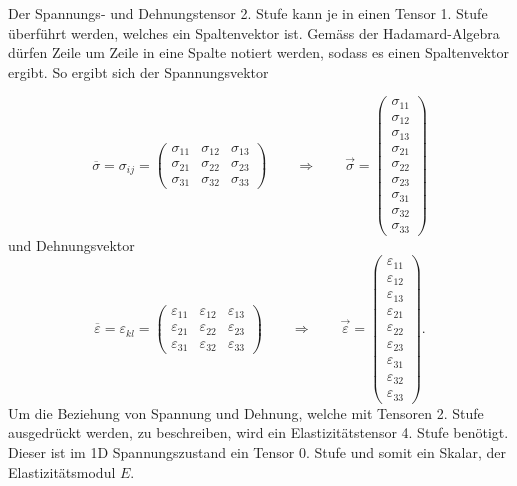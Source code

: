 Der Spannungs- und Dehnungstensor 2. Stufe kann je in einen Tensor 1. Stufe überführt werden, welches ein Spaltenvektor ist.
Gemäss der Hadamard-Algebra dürfen Zeile um Zeile in eine Spalte notiert werden, sodass es einen Spaltenvektor ergibt.
So ergibt sich der Spannungsvektor

\[
\overline{\sigma}
=
\sigma_{ij}
=
\begin{pmatrix}
	\sigma_{11} & \sigma_{12} & \sigma_{13} \\ 
	\sigma_{21} & \sigma_{22} & \sigma_{23} \\
	\sigma_{31} & \sigma_{32} & \sigma_{33}
\end{pmatrix}
\qquad
\Rightarrow
\qquad
\vec{\sigma}
=
\begin{pmatrix}
	\sigma_{11}\\
	\sigma_{12}\\
	\sigma_{13}\\
	\sigma_{21}\\
	\sigma_{22}\\
	\sigma_{23}\\
	\sigma_{31}\\
	\sigma_{32}\\
	\sigma_{33}
\end{pmatrix}
\]
und Dehnungsvektor
\[
\overline{\varepsilon}
=
\varepsilon_{kl}
=
\begin{pmatrix}
	\varepsilon_{11} & \varepsilon_{12} & \varepsilon_{13} \\ 
	\varepsilon_{21} & \varepsilon_{22} & \varepsilon_{23} \\
	\varepsilon_{31} & \varepsilon_{32} & \varepsilon_{33}
\end{pmatrix}
\qquad
\Rightarrow
\qquad
\vec{\varepsilon}
=
\begin{pmatrix}
	\varepsilon_{11} \\
	\varepsilon_{12} \\
	\varepsilon_{13} \\
	\varepsilon_{21} \\
	\varepsilon_{22} \\
	\varepsilon_{23} \\
	\varepsilon_{31} \\
	\varepsilon_{32} \\
	\varepsilon_{33}
\end{pmatrix}
.
\]
Um die Beziehung von Spannung und Dehnung, welche mit Tensoren 2. Stufe ausgedrückt werden, zu beschreiben, wird ein Elastizitätstensor 4. Stufe benötigt.
Dieser ist im 1D Spannungszustand ein Tensor 0. Stufe und somit ein Skalar, der Elastizitätsmodul $E$.

